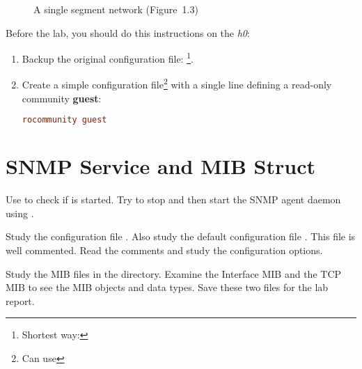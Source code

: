 \documentclass{../UTNetLab}
\begin{document}
\begin{center}
\begin{minipage}{0.48\textwidth}
\begin{flushright}
\begin{figure}[H]
                    \caption{A single segment network (Figure~1.3)}\label{fig:1.3}
                \end{figure}
            \end{flushright}
        \end{minipage}
    \end{center}

    Before the lab, you should do this instructions on the \textit{h0}:
    \begin{enumerate}
        \item Backup the original  configuration file:
        \footnote{Shortest way: }.
        \item Create a simple configuration file\footnote{Can use }  with a single line defining a read-only community \textbf{guest}:
        \begin{lstlisting}[language={conf}, emph={guest},morekeywords={[3]rocommunity}]
rocommunity guest
        \end{lstlisting}
    \end{enumerate}

\section{SNMP Service and MIB Struct}
    Use  to check if  is started.
    Try to stop and then start the SNMP agent daemon using .

    Study the  configuration file .
    Also study the default configuration file .
    This file is well commented.
    Read the comments and study the configuration options.

    Study the MIB files in the  directory.
    Examine the Interface MIB  and the TCP MIB  to see the MIB objects and data types.
    Save these two files for the lab report.
\end{document}
